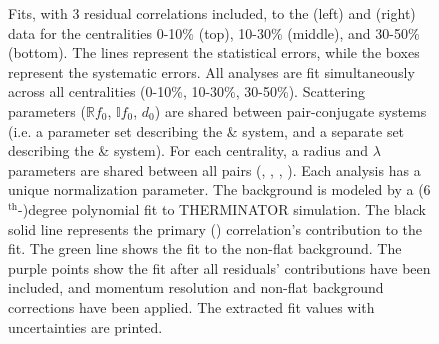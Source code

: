 \documentclass[/home/jesse/Analysis/FemtoAnalysis/AnalysisNotes/AnalysisNoteJBuxton.tex]{subfiles}
\renewcommand{\NonFlatBgdLamKch}{_NonFlatBgdCrctnPolynomial}
\renewcommand{\ResNum}{_3Res}
\renewcommand{\PrimMaxDecay}{_PrimMaxDecay10fm}
\renewcommand{\SaveNameModLamKch}{\MomRes\NonFlatBgdLamKch\ResNum\PrimMaxDecay\ResMethod\ParamFixAndShareLamKch}
\begin{document}
\begin{landscape}
\begin{figure}[h!]
  \centering
  \caption[\LamKchPALamKchM Fits with 3 Residuals]{Fits, with 3 residual correlations included, to the \LamKchP (left) and \ALamKchM (right) data for the centralities 0-10\% (top), 10-30\% (middle), and 30-50\% (bottom).
 The lines represent the statistical errors, while the boxes represent the systematic errors.  
 All \LamKpm analyses are fit simultaneously across all centralities (0-10\%, 10-30\%, 30-50\%).
 Scattering parameters ($\mathbb{R}f_{0}$, $\mathbb{I}f_{0}$, $d_{0}$) are shared between pair-conjugate systems (i.e. a parameter set describing the \LamKchP \& \ALamKchM system, and a separate set describing the \LamKchM \& \ALamKchP system).
 For each centrality, a radius and $\lambda$ parameters are shared between all pairs (\LamKchP, \ALamKchM, \LamKchM, \ALamKchP).
 Each analysis has a unique normalization parameter.
 The background is modeled by a (6$^{\mathrm{th}}$-)degree polynomial fit to THERMINATOR simulation.
 The black solid line represents the primary (\LamK) correlation's contribution to the fit.  
 The green line shows the fit to the non-flat background.
 The purple points show the fit after all residuals' contributions have been included, and momentum resolution and non-flat background corrections have been applied.
 The extracted fit values with uncertainties are printed.}
  \label{fig:LamKchPwConjFits_3Res}
\end{figure}


\end{landscape}
\end{document}
